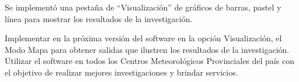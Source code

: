 \begin{conclusions}
Se implementó una pestaña de “Visualización” de gráﬁcos de barras, pastel y línea para mostrar los resultados de la investigación.




\end{conclusions}

\begin{recomendations}

Implementar en la próxima versión del software en la opción Visualización, el Modo Mapa para obtener salidas que ilustren los resultados de la investigación.\\
Utilizar el software en todos los Centros Meteorológicos Provinciales del país con el objetivo de realizar mejores investigaciones y brindar servicios.

\end{recomendations}